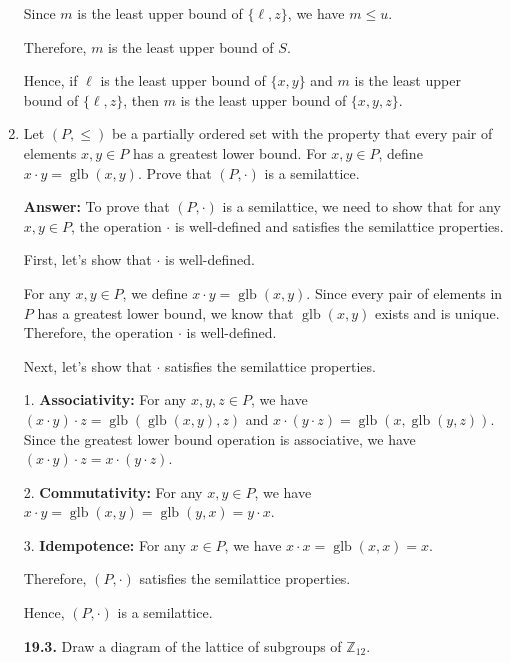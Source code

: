 \documentclass[12pt,reqno]{amsart}
\newcommand{\probskip}{\vskip1cm}
\begin{document}
\begin{enumerate}[{\bf 1.}]
Since $m$ is the least upper bound of $\{\ell, z\}$, we have $m \leq u$. 

Therefore, $m$ is the least upper bound of $S$. 

Hence, if $\ell$ is the least upper bound of $\{x, y\}$ and $m$ is the least upper bound of $\{\ell, z\}$, then $m$ is the least upper bound of $\{x, y, z\}$. 

\probskip

\item
Let $(P, \leq)$ be a partially ordered set with the property that every pair of
elements $x, y \in P$ has a greatest lower bound. For $x, y\in P$, define 
$x \cdot y = \operatorname{glb}(x,y)$. Prove that $(P, \cdot)$ is a semilattice.

\textbf{Answer:} To prove that $(P, \cdot)$ is a semilattice, we need to show that for any $x, y \in P$, the operation $\cdot$ is well-defined and satisfies the semilattice properties.

First, let's show that $\cdot$ is well-defined. 

For any $x, y \in P$, we define $x \cdot y = \operatorname{glb}(x,y)$. Since every pair of elements in $P$ has a greatest lower bound, we know that $\operatorname{glb}(x,y)$ exists and is unique. Therefore, the operation $\cdot$ is well-defined.

Next, let's show that $\cdot$ satisfies the semilattice properties. 

1. \textbf{Associativity:} For any $x, y, z \in P$, we have $(x \cdot y) \cdot z = \operatorname{glb}(\operatorname{glb}(x,y), z)$ and $x \cdot (y \cdot z) = \operatorname{glb}(x, \operatorname{glb}(y,z))$. Since the greatest lower bound operation is associative, we have $(x \cdot y) \cdot z = x \cdot (y \cdot z)$.

2. \textbf{Commutativity:} For any $x, y \in P$, we have $x \cdot y = \operatorname{glb}(x,y) = \operatorname{glb}(y,x) = y \cdot x$.

3. \textbf{Idempotence:} For any $x \in P$, we have $x \cdot x = \operatorname{glb}(x,x) = x$.

Therefore, $(P, \cdot)$ satisfies the semilattice properties.

Hence, $(P, \cdot)$ is a semilattice.

\probskip
 
\item[{\bf 19.3.}] 
Draw a diagram of the lattice of subgroups of ${\mathbb Z}_{12}$.


\end{enumerate}
\end{document}
